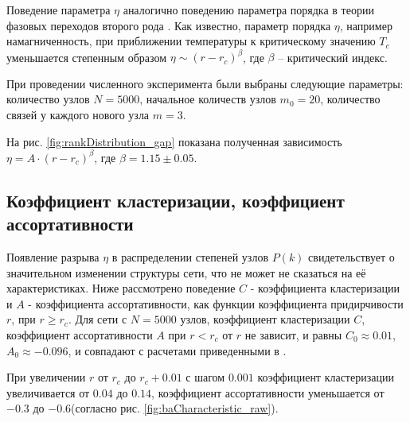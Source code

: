 \documentclass[10pt,aps,pra]{revtex4-1}
\begin{document}
        Поведение параметра $\eta$ аналогично поведению параметра порядка в теории фазовых переходов второго рода \cite{Landau}. Как известно, параметр порядка $\eta$, например намагниченность, при приближении температуры к критическому значению $T_c$ уменьшается степенным образом $\eta \sim (r-r_c)^\beta$, где $\beta$ – критический индекс. 

        При проведении численного эксперимента были выбраны следующие параметры: количество узлов $N=5000$, начальное количеств узлов $m_0=20$, количество связей у каждого нового узла $m=3$.

        На рис. \ref{fig:rankDistribution_gap} показана полученная зависимость $\eta = A \cdot {(r-r_c)}^\beta$, где $\beta = 1.15 \pm 0.05$.

    \subsection{Коэффициент кластеризации, коэффициент ассортативности}

        Появление разрыва $\eta$ в распределении степеней узлов $P(k)$ свидетельствует о значительном изменении структуры сети, что не может не сказаться на её характеристиках. Ниже рассмотрено поведение $C$ - коэффициента кластеризации и $A$ - коэффициента ассортативности, как функции коэффициента придирчивости $r$, при $r \geq r_c$. Для сети с $N=5000$ узлов, коэффициент кластеризации $C$, коэффициент ассортативности $A$ при $r<r_c$ от $r$ не зависит, и равны $C_0 \approx 0.01$, $A_0 \approx -0.096$, и совпадают с расчетами приведенными в \cite{AlBa2,Newman2}. 

        При увеличении $r$ от $r_c$ до $r_c + 0.01$ с шагом $0.001$ коэффициент кластеризации увеличивается от $0.04$ до $0.14$, коэффициент ассортативности уменьшается от $-0.3$ до $-0.6$(согласно рис. \ref{fig:baCharacteristic_raw}).
\end{document}
